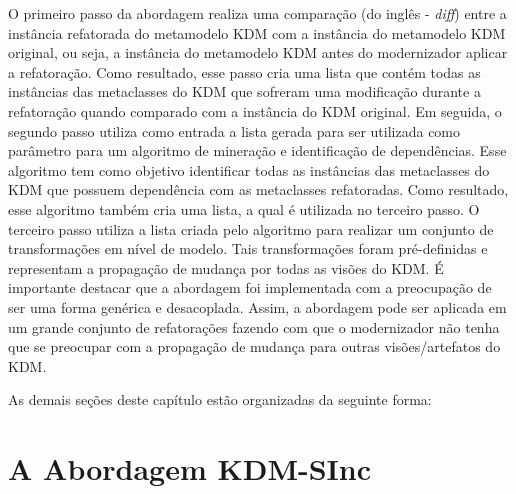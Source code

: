 O primeiro passo da abordagem realiza uma comparação (do inglês - \textit{diff}) entre a instância refatorada do metamodelo KDM com a instância do metamodelo KDM original, ou seja, a instância do metamodelo KDM antes do modernizador aplicar a refatoração. Como resultado, esse passo cria uma lista que contém todas as instâncias das metaclasses do KDM que sofreram uma modificação durante a refatoração quando comparado com a instância do KDM original. Em seguida, o segundo passo utiliza como entrada a lista gerada para ser utilizada como parâmetro para um algoritmo de mineração e identificação de dependências. Esse algoritmo tem como objetivo identificar todas as instâncias das metaclasses do KDM que possuem dependência com as metaclasses refatoradas. Como resultado, esse algoritmo também cria uma lista, a qual é utilizada no terceiro passo. O terceiro passo utiliza a lista criada pelo algoritmo para realizar um conjunto de transformações em nível de modelo. Tais transformações foram pré-definidas e representam a propagação de mudança por todas as visões do KDM. É importante destacar que a abordagem foi implementada com a preocupação de ser uma forma genérica e desacoplada. Assim, a abordagem pode ser aplicada em um grande conjunto de refatorações fazendo com que o modernizador não tenha que se preocupar com a propagação de mudança para outras visões/artefatos do KDM. 

As demais seções deste capítulo estão organizadas da seguinte forma:


\section{A Abordagem KDM-SInc}\label{sec:kdm_sinc}

